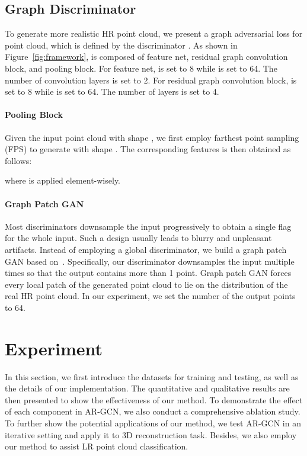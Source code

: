 \documentclass[10pt,twocolumn,letterpaper]{article}
\begin{document}
\subsection{Graph Discriminator}
To generate more realistic HR point cloud, we present a graph adversarial loss for point cloud, which is defined by the discriminator .
As shown in Figure~\ref{fig:framework},  is composed of feature net, residual graph convolution block, and pooling block.
For feature net,  is set to 8 while  is set to 64.
The number of convolution layers is set to 2.
For residual graph convolution block,  is set to 8 while  is set to 64.
The number of layers is set to 4.

\vspace{-1em}
\paragraph{Pooling Block}
Given the input point cloud  with shape , we first employ farthest point sampling (FPS) to generate  with shape .
The corresponding features  is then obtained as follows:

where  is applied element-wisely.

\vspace{-1em}
\paragraph{Graph Patch GAN}
Most discriminators downsample the input progressively to obtain a single flag for the whole input.
Such a design usually leads to blurry and unpleasant artifacts.
Instead of employing a global discriminator, we build a graph patch GAN based on~\cite{shrivastava2017learning}.
Specifically, our discriminator downsamples the input multiple times so that the output contains more than 1 point.
Graph patch GAN forces every local patch of the generated point cloud to lie on the distribution of the real HR point cloud.
In our experiment, we set the number of the output points to 64.

\section{Experiment}
In this section, we first introduce the datasets for training and testing, as well as the details of our implementation.
The quantitative and qualitative results are then presented to show the effectiveness of our method.
To demonstrate the effect of each component in AR-GCN, we also conduct a comprehensive ablation study.
To further show the potential applications of our method, we test AR-GCN in an iterative setting and apply it to 3D reconstruction task.
Besides, we also employ our method to assist LR point cloud classification.
\end{document}
